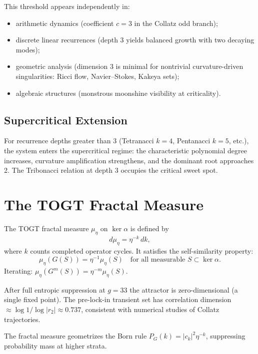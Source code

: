 \documentclass[11pt,a4paper]{article}
\theoremstyle{definition}
\theoremstyle{remark}
\begin{document}
This threshold appears independently in:
\begin{itemize}
  \item arithmetic dynamics (coefficient $c=3$ in the Collatz odd branch);
  \item discrete linear recurrences (depth 3 yields balanced growth with two decaying modes);
  \item geometric analysis (dimension 3 is minimal for nontrivial curvature-driven singularities:
  Ricci flow, Navier--Stokes, Kakeya sets);
  \item algebraic structures (monstrous moonshine visibility at criticality).
\end{itemize}

\subsection{Supercritical Extension}

For recurrence depths greater than 3 (Tetranacci $k=4$, Pentanacci $k=5$, etc.), the system
enters the supercritical regime: the characteristic polynomial degree increases, curvature
amplification strengthens, and the dominant root approaches 2. The Tribonacci relation at
depth 3 occupies the critical sweet spot.

\section{The TOGT Fractal Measure}

The TOGT fractal measure $\mu_\eta$ on $\ker\alpha$ is defined by
\[
  d\mu_\eta=\eta^{-k}\,dk,
\]
where $k$ counts completed operator cycles. It satisfies the self-similarity property:
\[
  \mu_\eta(G(S))=\eta^{-1}\mu_\eta(S)\quad\text{for all measurable }S\subset\ker\alpha.
\]
Iterating: $\mu_\eta(G^m(S))=\eta^{-m}\mu_\eta(S)$.

After full entropic suppression at $g=33$ the attractor is zero-dimensional (a single fixed
point). The pre-lock-in transient set has correlation dimension $\approx\log1/\log|r_2|\approx0.737$,
consistent with numerical studies of Collatz trajectories.

The fractal measure geometrizes the Born rule $P_G(k)=|c_k|^2\eta^{-k}$, suppressing
probability mass at higher strata.

\end{document}
